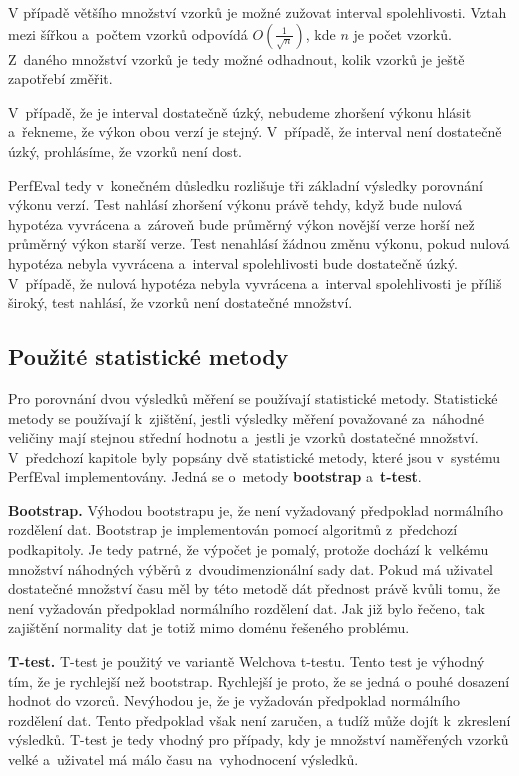 V případě většího množství vzorků je možné zužovat interval spolehlivosti. Vztah mezi
šířkou a~počtem vzorků odpovídá $O(\frac{1}{\sqrt{n}})$, kde $n$ je počet vzorků. Z~daného
množství vzorků je tedy možné odhadnout, kolik vzorků je ještě zapotřebí změřit.

V~případě, že je interval dostatečně úzký, nebudeme zhoršení výkonu hlásit a~řekneme, že výkon obou verzí je stejný.
V~případě, že interval není dostatečně úzký, prohlásíme, že vzorků není dost.

PerfEval tedy v~konečném důsledku rozlišuje tři základní výsledky porovnání výkonu verzí.
Test nahlásí zhoršení výkonu právě tehdy, když bude nulová hypotéza vyvrácena a~zároveň
bude průměrný výkon novější verze horší než průměrný výkon starší verze.
Test nenahlásí žádnou změnu výkonu, pokud nulová hypotéza nebyla vyvrácena a~interval spolehlivosti
bude dostatečně úzký. V~případě, že nulová hypotéza nebyla vyvrácena a~interval spolehlivosti
je příliš široký, test nahlásí, že vzorků není dostatečné množství.

\subsection{Použité statistické metody}
Pro porovnání dvou výsledků měření se používají statistické metody. Statistické metody se používají k~zjištění,
jestli výsledky měření považované za~náhodné veličiny mají stejnou střední hodnotu a~jestli je vzorků dostatečné množství.
V~předchozí kapitole byly popsány dvě statistické metody, které jsou v~systému PerfEval implementovány.
Jedná se o~metody \textbf{bootstrap} a~\textbf{t-test}.

\medskip

\noindent\textbf{Bootstrap.} Výhodou bootstrapu je, že není vyžadovaný předpoklad normálního rozdělení dat.
Bootstrap je implementován pomocí algoritmů z~předchozí podkapitoly. Je tedy patrné, že výpočet je pomalý,
protože dochází k~velkému množství náhodných výběrů z~dvoudimenzionální sady dat. Pokud má uživatel
dostatečné množství času měl by této metodě dát přednost právě kvůli tomu, že není vyžadován předpoklad normálního rozdělení dat.
Jak již bylo řečeno, tak zajištění normality dat je totiž mimo doménu řešeného problému.

\medskip

\noindent\textbf{T-test.} T-test je použitý ve variantě Welchova t-testu. Tento test je výhodný tím, že je rychlejší než bootstrap.
Rychlejší je proto, že se jedná o pouhé dosazení hodnot do vzorců. Nevýhodou je, že je vyžadován předpoklad normálního rozdělení dat.
Tento předpoklad však není zaručen, a tudíž může dojít k~zkreslení výsledků. T-test je tedy vhodný pro případy, kdy je množství naměřených
vzorků velké a~uživatel má málo času na~vyhodnocení výsledků.

